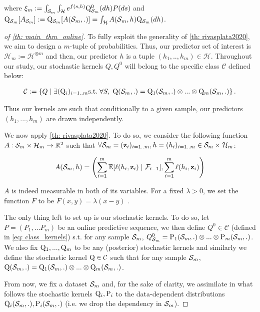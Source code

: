 \begin{noaddcontents}
\begin{theorem}
where $\xi_m:=\int_{\mathcal{S}_m} \int_{\mathcal{H}} e^{f(s, h)} \mathrm{Q}_{\mathcal{S}_m}^{0}(d h) P(d s)$ and $\mathrm{Q}_{\mathcal{S}_m}[A_{\mathcal{S}_m}]:= \mathrm{Q}_{\mathcal{S}_m}[A(\mathcal{S}_m,.)]= \int_{\mathcal{H}} A(\mathcal{S}_m,h) \mathrm{Q}_{\mathcal{S}_m}(dh)$.
\end{theorem}


\begin{proof}[of \cref{th: main_thm_online}]


To fully exploit the generality of \cref{th: rivasplata2020}, we aim to design a $m$-tuple of probabilities. Thus, our predictor set of interest is $\mathcal{H}_m:= \mathcal{H}^{\otimes m}$ and then, our predictor $h$ is a tuple $(h_1,..,h_m)\in\mathcal{H}$. Throughout our study, our stochastic kernels $Q,Q^0$ will belong to the specific class $\mathcal{C}$ defined below:

\begin{align}
  \label{eq: class_kernels}
  \mathcal{C}:= \left\{ Q \mid   \exists (\mathrm{Q}_{i})_{i=1..m}\text{s.t.}\; \forall S,\;  \mathrm{Q}(\mathcal{S}_m,.) = \mathrm{Q}_1(\mathcal{S}_m,.)\otimes...\otimes \mathrm{Q}_m(\mathcal{S}_m,.)      \right\}.
\end{align}


\noindent Thus our kernels are such that conditionally to a given sample, our predictors $(h_1,...,h_m)$ are drawn independently.

\noindent We now apply \cref{th: rivasplata2020}. To do so, we consider the following function $A: \mathcal{S}_m\times \mathcal{H}_m \rightarrow \mathbb{R}^2$ such that $\forall \mathcal{S}_m= (\mathbf{z}_i)_{i=1..m},h= (h_i)_{i=1..m}\in \mathcal{S}_m\times \mathcal{H}_m$:

\[  A(\mathcal{S}_m,h)= \left(\sum_{i=1}^m \mathbb{E}[\ell(h_i,\mathbf{z}_i)\mid \mathcal{F}_{i-1}], \sum_{i=1}^m \ell(h_i,\mathbf{z}_i)  \right)   \]

\noindent $A$ is indeed measurable in both of its variables. For a fixed $\lambda>0$, we set the function $F$ to be $F(x,y)= \lambda(x-y)$ .


 \noindent The only thing left to set up is our stochastic kernels. To do so, let $P=(P_1,...P_m)$ be an online predictive sequence, we then define $Q^0\in\mathcal{C}$ (defined in \cref{eq: class_kernels}) s.t. for any sample $\mathcal{S}_m$, $\\Q_{\mathcal{S}_m}^0 = \mathrm{P}_1(\mathcal{S}_m,.)\otimes...\otimes \mathrm{P}_m(\mathcal{S}_m,.)$. We also fix $\mathrm{Q}_1,...,\mathrm{Q}_m$ to be any (posterior)
 stochastic kernels and similarly we define the stochastic kernel $\mathrm{Q}\in\mathcal{C}$ such that for any sample $\mathcal{S}_m$, $\mathrm{Q}(\mathcal{S}_m,.) = \mathrm{Q}_1(\mathcal{S}_m,.)\otimes...\otimes \mathrm{Q}_m(\mathcal{S}_m,.)$.

 From now, we fix a dataset $\mathcal{S}_m$ and, for the sake of clarity, we assimilate in what follows the stochastic kernels $\mathrm{Q}_{i},\mathrm{P}_{i}$ to the data-dependent distributions $\mathrm{Q}_{i}(\mathcal{S}_m,.), \mathrm{P}_{i}(\mathcal{S}_m,.)$ (i.e. we drop the dependency in $\mathcal{S}_m$).


\end{proof}
\end{noaddcontents}
